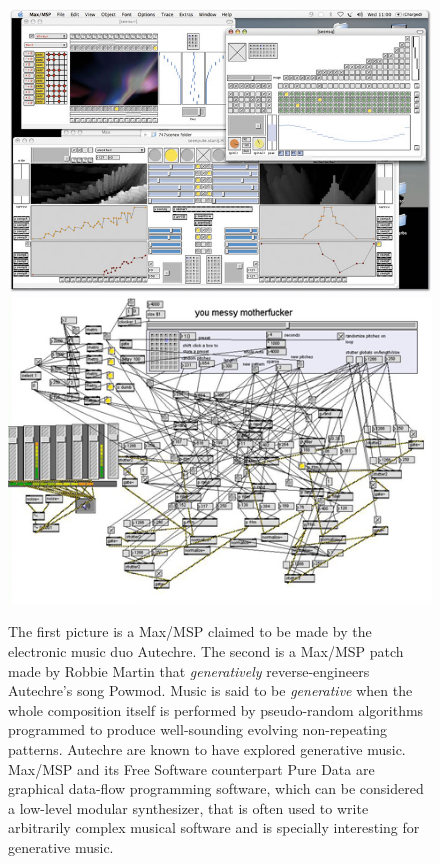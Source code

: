 \begin{figure}
  \centering
  \includegraphics[width=.7\textwidth]{pic/autechre-2.jpg}
  \includegraphics[width=.7\textwidth]{pic/autechre-1.jpg}
  \caption[Autechre related Max/MSP patches]{The first picture is a
    Max/MSP claimed to be made by the electronic music duo
    Autechre\cite{autechrepatch}. The second is a Max/MSP patch made
    by Robbie Martin that \emph{generatively} reverse-engineers Autechre's
    song Powmod. Music is said to be \emph{generative} when the whole
    composition itself is performed by pseudo-random algorithms
    programmed to produce well-sounding evolving non-repeating
    patterns. Autechre are known to have explored generative
    music. Max/MSP and its Free Software counterpart Pure Data are
    graphical data-flow programming software, which can be considered
    a low-level modular synthesizer, that is often used to write
    arbitrarily complex musical software and is specially interesting
    for generative music.}
  \label{fig:autechre}
\end{figure}

